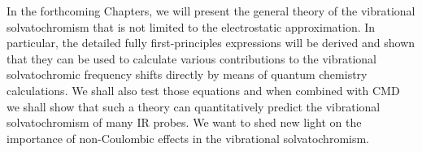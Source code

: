 \documentclass[a4paper,titlepage,twoside,fleqn,12pt]{book}
\begin{document}
\begin{refsection}
In the forthcoming Chapters, we will present the general theory of the vibrational
solvatochromism that is not limited to the electrostatic approximation. 
In particular, the detailed fully first\hyp{}principles expressions
will be derived and shown 
that they can be used to calculate various contributions to the vibrational solvatochromic frequency
shifts directly by means of quantum chemistry calculations. We shall also test those equations 
and when combined with CMD we shall show that such a theory can quantitatively predict the
vibrational solvatochromism of many IR probes. We want to shed new light
on the importance of non\hyp{}Coulombic effects
in the vibrational solvatochromism.

\printbibliography[heading=subbibintoc,title={References}]
\end{refsection}

\end{document}
